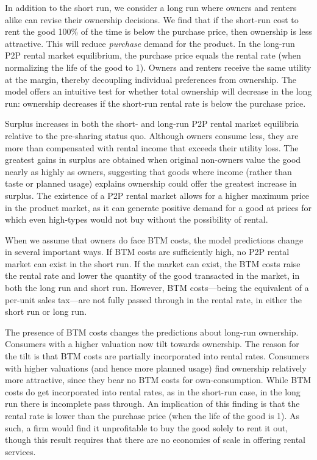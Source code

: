 \documentclass[12pt]{article}
\begin{document}
In addition to the short run, we consider a long run where owners and renters alike can revise their ownership decisions.
We find that if the short-run cost to rent the good 100\% of the time is below the purchase price, then ownership is less attractive.
This will reduce \emph{purchase} demand for the product.
In the long-run P2P rental market equilibrium, the purchase price equals the rental rate (when normalizing the life of the good to 1).
Owners and renters receive the same utility at the margin, thereby decoupling individual preferences from ownership. 
The model offers an intuitive test for whether total ownership will decrease in the long run:
ownership decreases if the short-run rental rate is below the purchase price. 

Surplus increases in both the short- and long-run P2P rental market equilibria relative to the pre-sharing status quo.
Although owners consume less, they are more than compensated with rental income that exceeds their utility loss. 
The greatest gains in surplus are obtained when original non-owners value the good nearly as highly as owners, suggesting that goods where income (rather than taste or planned usage) explains ownership could offer the greatest increase in surplus. 
The existence of a P2P rental market allows for a higher maximum price in the product market, as it can generate positive demand for a good at prices for which even high-types would not buy without the possibility of rental. 

When we assume that owners do face BTM costs, the model predictions change in several important ways.
If BTM costs are sufficiently high, no P2P rental market can exist in the short run.
If the market can exist, the BTM costs raise the rental rate and lower the quantity of the good transacted in the market, in both the long run and short run.
However, BTM costs---being the equivalent of a per-unit sales tax---are not fully passed through in the rental rate, in either the short run or long run.

The presence of BTM costs changes the predictions about long-run ownership.
Consumers with a higher valuation now tilt towards ownership.
The reason for the tilt is that BTM costs are partially incorporated into rental rates.
Consumers with higher valuations (and hence more planned usage) find ownership relatively more attractive, since they bear no BTM costs for own-consumption.   
While BTM costs do get incorporated into rental rates, as in the short-run case, in the long run there is incomplete pass through.
An implication of this finding is that the rental rate is lower than the purchase price (when the life of the good is 1).
As such, a firm would find it unprofitable to buy the good solely to rent it out, though this result requires that there are no economies of scale in offering rental services. 
\end{document}
